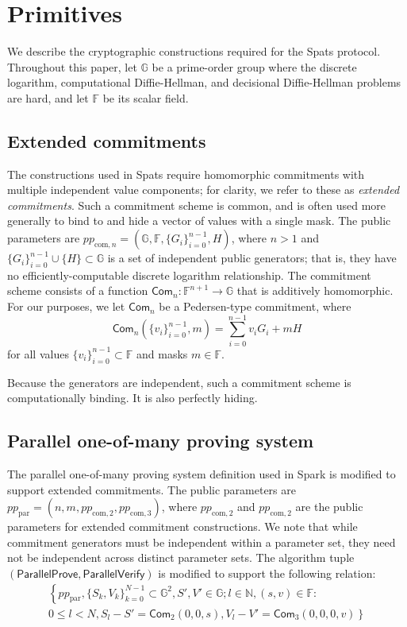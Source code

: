 \documentclass{article}
\newcommand{\G}{\mathbb{G}}
\newcommand{\F}{\mathbb{F}}
\newcommand{\func}[1]{\mathsf{#1}}
\newcommand{\com}{\func{Com}}
\begin{document}
\section{Primitives}

We describe the cryptographic constructions required for the Spats protocol.
Throughout this paper, let $\G$ be a prime-order group where the discrete logarithm, computational Diffie-Hellman, and decisional Diffie-Hellman problems are hard, and let $\F$ be its scalar field.


\subsection{Extended commitments}

The constructions used in Spats require homomorphic commitments with multiple independent value components; for clarity, we refer to these as \textit{extended commitments}.
Such a commitment scheme is common, and is often used more generally to bind to and hide a vector of values with a single mask.
The public parameters are $pp_{\text{com},n} = (\G, \F, \{G_i\}_{i=0}^{n-1}, H)$, where $n > 1$ and $\{G_i\}_{i=0}^{n-1} \cup \{H\} \subset \G$ is a set of independent public generators; that is, they have no efficiently-computable discrete logarithm relationship.
The commitment scheme consists of a function $\com_n: \F^{n+1} \to \G$ that is additively homomorphic.
For our purposes, we let $\com_n$ be a Pedersen-type commitment, where $$\com_n(\{v_i\}_{i=0}^{n-1}, m) = \sum_{i=0}^{n-1} v_i G_i + mH$$ for all values $\{v_i\}_{i=0}^{n-1} \subset \F$ and masks $m \in \F$.

Because the generators are independent, such a commitment scheme is computationally binding.
It is also perfectly hiding.


\subsection{Parallel one-of-many proving system}

The parallel one-of-many proving system definition used in Spark is modified to support extended commitments.
The public parameters are $pp_{\text{par}} = (n, m, pp_{\text{com},2}, pp_{\text{com},3})$, where $pp_{\text{com},2}$ and $pp_{\text{com},2}$ are the public parameters for extended commitment constructions.
We note that while commitment generators must be independent within a parameter set, they need not be independent across distinct parameter sets.
The algorithm tuple $(\func{ParallelProve}, \func{ParallelVerify})$ is modified to support the following relation:
\begin{multline*}
\left\{ pp_{\text{par}}, \{S_k,V_k\}_{k=0}^{N-1} \subset \G^2, S',V' \in \G ; l \in \mathbb{N}, (s,v) \in \F : \right. \\
\left. 0 \leq l < N, S_l - S' = \com_2(0,0,s), V_l - V' = \com_3(0,0,0,v) \right\}
\end{multline*}
\end{document}
